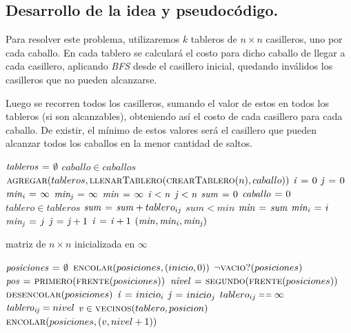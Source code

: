 \newpage
\subsection{Desarrollo de la idea y pseudocódigo.}

\vspace*{0.3cm}

Para resolver este problema, utilizaremos $k$ tableros de $n \times n$
casilleros, uno por cada caballo. En cada tablero se calculará el costo para
dicho caballo de llegar a cada casillero, aplicando \textit{BFS} desde el
casillero inicial, quedando inválidos los casilleros que no pueden
alcanzarse.

Luego se recorren todos los casilleros, sumando el valor de estos en todos
los tableros (si son alcanzables), obteniendo así el costo de cada casillero
para cada caballo. De existir, el mínimo de estos valores será el casillero
que pueden alcanzar todos los caballos en la menor cantidad de saltos.

\begin{codebox}
\li $\id{tableros} \gets \emptyset$
\li \For $caballo \in caballos$ \Do
\li   $\textnormal{\scshape agregar}(tableros,
                      \textnormal{\scshape llenarTablero}(\textnormal{\scshape crearTablero}(n),
                                           caballo))$
    \End
\li $\id{i} \gets 0$
\li $\id{j} \gets 0$
\li $\id{min_i} \gets \infty$
\li $\id{min_j} \gets \infty$
\li $\id{min} \gets \infty$
\li \While $\id{i} < \id{n}$ \Do
\li   \While $\id{j} < \id{n}$ \Do
\li     $\id{sum} \gets 0$
\li     $\id{caballo} \gets 0$
\li     \For $tablero \in tableros$ \Do
\li         $\id{sum} \gets \id{sum} + tablero_{ij}$
        \End
\li     \If $sum < min$ \Then
\li       $\id{min} \gets \id{sum}$
\li       $\id{min_i} \gets i$
\li       $\id{min_j} \gets j$
        \End
\li   $\id{j} \gets \id{j} + 1$
      \End
\li $\id{i} \gets \id{i} + 1$
    \End
\li \Return $(\id{min}, \id{min_i}, \id{min_j})$
\end{codebox}


\begin{codebox}
\li \Return matriz de $n \times n$ inicializada en $\infty$
\end{codebox}


\begin{codebox}
\li $\id{posiciones} \gets \emptyset$
\li $\textnormal{\scshape encolar}(posiciones, (inicio, 0))$
\li \While $\lnot \textnormal{\scshape vacio?}(posiciones)$ \Do
\li   $\id{pos} \gets \proc{primero}(\proc{frente}(posiciones))$
\li   $\id{nivel} \gets \proc{segundo}(\proc{frente}(posiciones))$
\li   $\textnormal{\scshape desencolar}(posiciones)$
\li   $\id{i} \gets inicio_i$
\li   $\id{j} \gets inicio_j$
\li   \If $tablero_{ij} \isequal \infty$ \Then
\li     $\id{tablero_{ij}} = nivel$
\li     \For $\id{v} \in \proc{vecinos}(tablero, posicion)$ \Do
\li       $\textnormal{\scshape encolar}(posiciones, (v, nivel + 1))$
        \End
      \End
    \End
\end{codebox}

